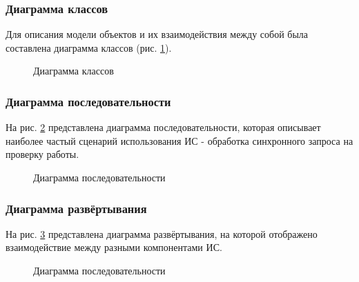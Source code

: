 		\subsubsection{Диаграмма классов}

			Для описания модели объектов и их взаимодействия между собой была составлена диаграмма классов (рис. \ref{img:class_diagram}).
			\newline
			\begin{figure}[h]
				\caption{Диаграмма классов}
				\label{img:class_diagram}
			\end{figure}

		\newpage
		\subsubsection{Диаграмма последовательности}

			На рис. \ref{img:sequence_diagram} представлена диаграмма последовательности, которая описывает наиболее частый сценарий использования ИС - обработка синхронного запроса на проверку работы.	
			\newline
			\begin{figure}[h]
				\caption{Диаграмма последовательности}
				\label{img:sequence_diagram}
			\end{figure}

		\newpage
		\subsubsection{Диаграмма развёртывания}

			На рис. \ref{img:deployment_diagram} представлена диаграмма развёртывания, на которой отображено взаимодействие между разными компонентами ИС.
			\newline
			\begin{figure}[h]
				\caption{Диаграмма последовательности}
				\label{img:deployment_diagram}
			\end{figure}